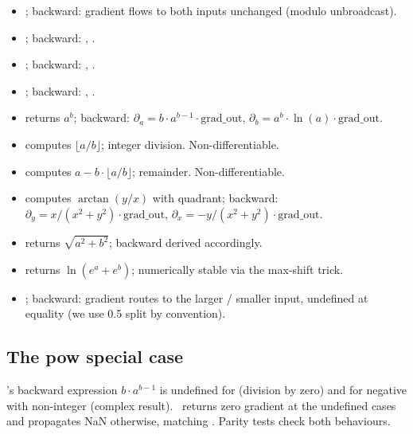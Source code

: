 \begin{itemize}
  \item {}; backward: gradient flows to both
    inputs unchanged (modulo unbroadcast).
  \item {}; backward: , .
  \item {}; backward: , .
  \item {}; backward: , .
  \item {} returns $a^b$; backward: $\partial_a = b
    \cdot a^{b-1} \cdot \text{grad\_out}$, $\partial_b = a^b \cdot
    \ln(a) \cdot \text{grad\_out}$.
  \item {} computes $\lfloor a / b \rfloor$;
    integer division. Non-differentiable.
  \item {} computes $a - b \cdot \lfloor a/b \rfloor$;
    remainder. Non-differentiable.
  \item {} computes $\arctan(y/x)$ with quadrant;
    backward: $\partial_y = x/(x^2 + y^2) \cdot \text{grad\_out}$,
    $\partial_x = -y/(x^2 + y^2) \cdot \text{grad\_out}$.
  \item {} returns $\sqrt{a^2 + b^2}$; backward derived
    accordingly.
  \item {} returns $\ln(e^a + e^b)$;
    numerically stable via the max-shift trick.
  \item {}; backward: gradient
    routes to the larger / smaller input, undefined at equality
    (we use 0.5 split by convention).
\end{itemize}

\subsection{The pow special case}
\label{ssec:binary_functions:pow_special}

's backward expression $b \cdot a^{b-1}$ is undefined
for  (division by zero) and for negative 
with non-integer  (complex result). \Lucid\ returns zero
gradient at the undefined cases and propagates NaN otherwise,
matching . Parity tests check both behaviours.

